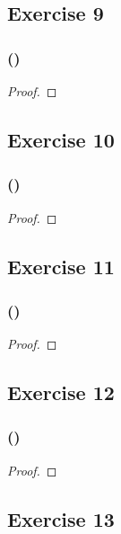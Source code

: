 \documentclass[14pt]{extarticle}
\begin{document}
\subsection{Exercise 9}

\subsubsection{()}

\begin{proof}

\end{proof}

\subsection{Exercise 10}

\subsubsection{()}

\begin{proof}

\end{proof}

\subsection{Exercise 11}

\subsubsection{()}

\begin{proof}

\end{proof}

\subsection{Exercise 12}

\subsubsection{()}

\begin{proof}

\end{proof}

\subsection{Exercise 13}
\end{document}

